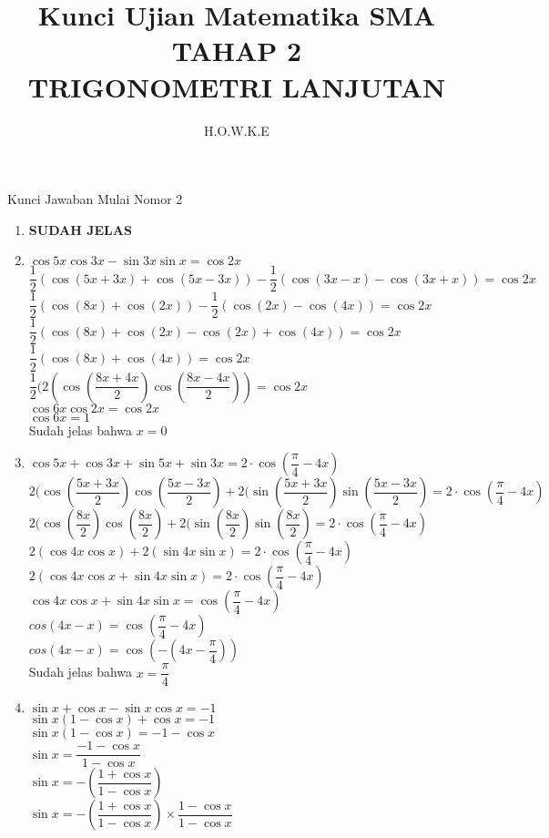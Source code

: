 \documentclass[12pt,a4paper]{article}
\author{H.O.W.K.E}
\title{Kunci Ujian Matematika SMA TAHAP 2\\ TRIGONOMETRI LANJUTAN}
\begin{document}
	\maketitle
	Kunci Jawaban Mulai Nomor 2
	\begin{enumerate}
	\item \textbf{SUDAH JELAS}
	\item $\cos 5x\cos3x-\sin3x\sin x =\cos 2x$\medskip \\
		  $\dfrac{1}{2}(\cos (5x+3x)+\cos(5x-3x))-\dfrac{1}{2}(\cos(3x-x)-\cos(3x+x))=\cos 2x$\medskip \\
		  $\dfrac{1}{2}(\cos (8x)+\cos(2x))-\dfrac{1}{2}(\cos(2x)-\cos(4x))=\cos 2x$\medskip \\
		  $\dfrac{1}{2}(\cos (8x)+\cos(2x)-\cos(2x)+\cos(4x))=\cos 2x$\medskip \\
		  $\dfrac{1}{2}(\cos (8x)+\cos(4x))=\cos 2x$\medskip \\
		  $\dfrac{1}{2}(2(\cos(\dfrac{8x+4x}{2})\cos(\dfrac{8x-4x}{2}))=\cos 2x$\medskip \\
		  $\cos6x\cos2x=\cos2x$\medskip \\
		  $\cos6x=1$\medskip \\
		  Sudah jelas bahwa $x=0$
		 
	\item $\cos 5x + \cos 3x + \sin 5x + \sin 3x = 2\cdot \cos (\dfrac{\pi}{4}-4x)$\medskip \\
		  $2(\cos(\dfrac{5x+3x}{2})\cos(\dfrac{5x-3x}{2})+2(\sin(\dfrac{5x+3x}{2})\sin(\dfrac{5x-3x}{2})=2\cdot \cos (\dfrac{\pi}{4}-4x)$\medskip \\
		  $2(\cos(\dfrac{8x}{2})\cos(\dfrac{8x}{2})+2(\sin(\dfrac{8x}{2})\sin(\dfrac{8x}{2})= 2\cdot \cos (\dfrac{\pi}{4}-4x)$\medskip \\
		  $2(\cos 4x \cos x)+2(\sin 4x \sin x)=2\cdot \cos (\dfrac{\pi}{4}-4x)$\medskip \\
		  $2(\cos 4x \cos x + \sin 4x \sin x)=2\cdot \cos (\dfrac{\pi}{4}-4x)$\medskip \\
		  $\cos 4x \cos x + \sin 4x \sin x=\cos (\dfrac{\pi}{4}-4x)$\medskip \\
		  $cos(4x-x)=\cos (\dfrac{\pi}{4}-4x)$\medskip \\
		  $cos(4x-x)=\cos (-(4x-\dfrac{\pi}{4}))$\medskip \\
		  Sudah jelas bahwa $x=\dfrac{\pi}{4}$
		   
		  \item $\sin x + \cos x -\sin x\cos x=-1$\medskip \\
			   $\sin x (1-\cos x)+ \cos x =-1 $\medskip \\
			   $\sin x(1-\cos x)=-1-\cos x $\medskip \\
			   $\sin x= \dfrac{-1-\cos x}{1-\cos x} $\medskip \\
			   $\sin x = -(\dfrac{1+\cos x}{1-\cos x})$\medskip \\
			   $\sin x = -(\dfrac{1+\cos x}{1-\cos x})\times \dfrac{1-\cos x}{1-\cos x}$\medskip \\
			   

\end{enumerate}
\end{document}

